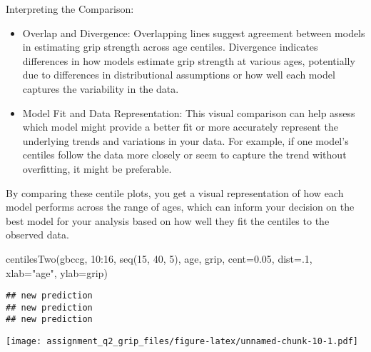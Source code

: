 \documentclass[
]{article}
\newenvironment{Shaded}{\begin{snugshade}}{\end{snugshade}}
\newcommand{\AttributeTok}[1]{\textcolor[rgb]{0.77,0.63,0.00}{#1}}
\newcommand{\ConstantTok}[1]{\textcolor[rgb]{0.00,0.00,0.00}{#1}}
\newcommand{\DecValTok}[1]{\textcolor[rgb]{0.00,0.00,0.81}{#1}}
\newcommand{\FloatTok}[1]{\textcolor[rgb]{0.00,0.00,0.81}{#1}}
\newcommand{\FunctionTok}[1]{\textcolor[rgb]{0.00,0.00,0.00}{#1}}
\newcommand{\NormalTok}[1]{#1}
\newcommand{\SpecialCharTok}[1]{\textcolor[rgb]{0.00,0.00,0.00}{#1}}
\newcommand{\StringTok}[1]{\textcolor[rgb]{0.31,0.60,0.02}{#1}}
\begin{document}
Interpreting the Comparison:

\begin{itemize}
\item
  Overlap and Divergence: Overlapping lines suggest agreement between
  models in estimating grip strength across age centiles. Divergence
  indicates differences in how models estimate grip strength at various
  ages, potentially due to differences in distributional assumptions or
  how well each model captures the variability in the data.
\item
  Model Fit and Data Representation: This visual comparison can help
  assess which model might provide a better fit or more accurately
  represent the underlying trends and variations in your data. For
  example, if one model's centiles follow the data more closely or seem
  to capture the trend without overfitting, it might be preferable.
\end{itemize}

By comparing these centile plots, you get a visual representation of how
each model performs across the range of ages, which can inform your
decision on the best model for your analysis based on how well they fit
the centiles to the observed data.

\begin{Shaded}
\begin{Highlighting}[]
\FunctionTok{centilesTwo}\NormalTok{(gbccg, }\DecValTok{10}\SpecialCharTok{:}\DecValTok{16}\NormalTok{, }\FunctionTok{seq}\NormalTok{(}\DecValTok{15}\NormalTok{, }\DecValTok{40}\NormalTok{, }\DecValTok{5}\NormalTok{), age,  grip, }\AttributeTok{cent=}\FloatTok{0.05}\NormalTok{, }\AttributeTok{dist=}\NormalTok{.}\DecValTok{1}\NormalTok{, }\AttributeTok{xlab=}\StringTok{"age"}\NormalTok{, }\AttributeTok{ylab=}\StringTok{\textquotesingle{}grip\textquotesingle{}}\NormalTok{)}
\end{Highlighting}
\end{Shaded}

\begin{verbatim}
## new prediction 
## new prediction 
## new prediction
\end{verbatim}

\texttt{[image: assignment\_q2\_grip\_files/figure-latex/unnamed-chunk-10-1.pdf]}

\begin{Shaded}
\end{Shaded}
\end{document}
